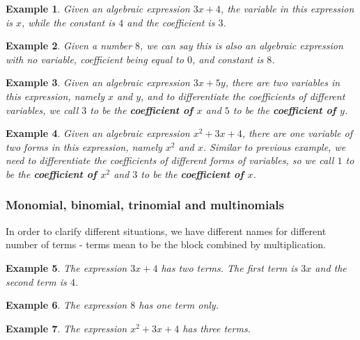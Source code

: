 \documentclass[12pt]{article}
\newtheorem*{example}{Example}
\begin{document}
    \begin{example}
        Given an algebraic expression $3x+4$, the variable in this expression is $x$, while the constant is $4$ and the coefficient is $3$.
    \end{example}

    \begin{example}
        Given a number $8$, we can say this is also an algebraic expression with no variable, coefficient being equal to $0$, and constant is $8$.
    \end{example}

    \begin{example}
        Given an algebraic expression $3x+5y$, there are two variables in this expression, namely $x$ and $y$, and to differentiate the coefficients of different variables, we call $3$ to be the \textbf{coefficient of $x$} and $5$ to be the \textbf{coefficient of $y$}.
    \end{example}

    \begin{example}
        Given an algebraic expression $x^2+3x+4$, there are one variable of two forms in this expression, namely $x^2$ and $x$. Similar to previous example, we need to differentiate the coefficients of different forms of variables, so we call $1$ to be the \textbf{coefficient of $x^2$} and $3$ to be the \textbf{coefficient of $x$}.
    \end{example}

    \subsubsection*{Monomial, binomial, trinomial and multinomials}

    In order to clarify different situations, we have different names for different number of terms - terms mean to be the block combined by multiplication.

    \begin{example}
        The expression $3x+4$ has two terms. The first term is $3x$ and the second term is $4$.
    \end{example}

    \begin{example}
        The expression $8$ has one term only.
    \end{example}

    \begin{example}
        The expression $x^2+3x+4$ has three terms.
    \end{example}
\end{document}
